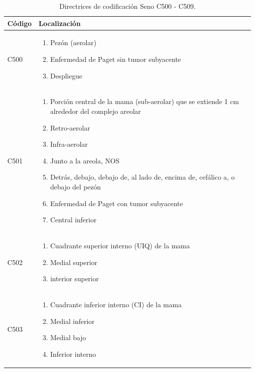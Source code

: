 \begin{table}
	\begin{threeparttable}[hbt!]
		\caption{Directrices de codificación Seno C500 - C509.}
		\label{Tabla_SEER}
		\begin{tabular}{ p{2cm} p{6cm}} \toprule
			Código 
			&Localización           
			\\ \hline	
			C500
			& \begin{enumerate}
				\item Pezón (aerolar)
				\item Enfermedad de Paget sin tumor subyacente
				\item Despliegue 
			\end{enumerate}
		
			\\ \hline
			C501
			& \begin{enumerate}
				\item Porción central de la mama (sub-aerolar) que se extiende 1 cm alrededor del complejo areolar
				\item Retro-aerolar
				\item Infra-aerolar
				\item Junto a la areola, NOS
				\item Detrás, debajo, debajo de, al lado de, encima de, cefálico a, o debajo del pezón
				\item Enfermedad de Paget con tumor subyacente
				\item Central inferior
			  \end{enumerate}
		
			\\ \hline
			C502
			& \begin{enumerate}
				\item Cuadrante superior interno (UIQ) de la mama
				\item Medial superior
				\item interior superior
			\end{enumerate}
			
			\\ \hline
		   C503
			& \begin{enumerate}
				\item Cuadrante inferior interno (CI) de la mama
				\item Medial inferior
				\item Medial bajo
				\item Inferior interno
			\end{enumerate}
		

\end{tabular}
\end{threeparttable}
\end{table}
